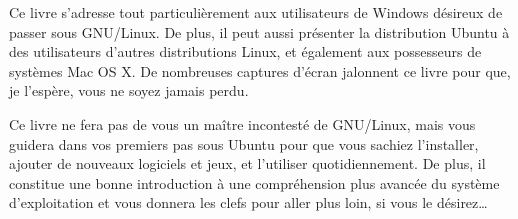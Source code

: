 Ce livre s'adresse tout particulièrement aux utilisateurs de Windows désireux de passer sous GNU/Linux. De plus, il peut aussi présenter la distribution Ubuntu à des utilisateurs d'autres distributions Linux, et également aux possesseurs de systèmes Mac OS X. De nombreuses captures d'écran jalonnent ce livre pour que, je l'espère, vous ne soyez jamais perdu.\par
Ce livre ne fera pas de vous un maître incontesté de GNU/Linux, mais vous guidera dans vos premiers pas sous Ubuntu pour que vous sachiez l'installer, ajouter de nouveaux logiciels et jeux, et l'utiliser quotidiennement. De plus, il constitue une bonne introduction à une compréhension plus avancée du système d'exploitation et vous donnera les clefs pour aller plus loin, si vous le désirez\ldots{}\par
